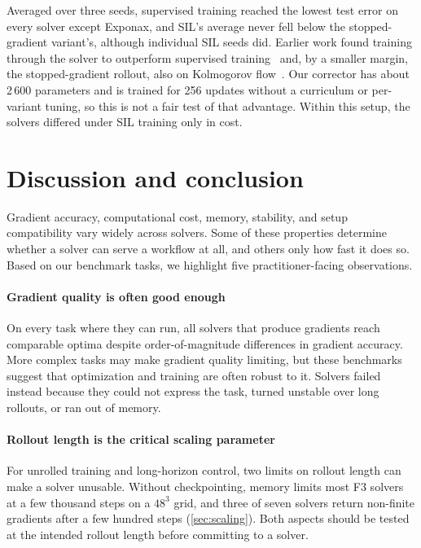 Averaged over three seeds, supervised training reached the lowest test error
on every solver except Exponax, and SIL's average never fell below the
stopped-gradient variant's, although individual SIL seeds did. Earlier work found
training through the solver to outperform supervised
training~\cite{um2020sol} and, by a smaller margin, the stopped-gradient
rollout, also on Kolmogorov flow~\cite{list2024differentiability}. Our
corrector has about 2\,600 parameters and is trained for 256 updates without a
curriculum or per-variant tuning, so this is not a fair test of that advantage.
Within this setup, the solvers differed under SIL training only in cost.

\section{Discussion and conclusion}
\label{sec:conclusion}

Gradient accuracy, computational cost, memory, stability, and setup
compatibility vary widely across solvers. Some of these properties
determine whether a solver can serve a workflow at all, and others only how fast it does so. Based on our
benchmark tasks, we highlight five practitioner-facing observations.

\paragraph{Gradient quality is often good enough}
On every task where they can run, all solvers that produce gradients
reach comparable optima despite order-of-magnitude differences in
gradient accuracy. More complex tasks may make gradient quality limiting,
but these benchmarks suggest that optimization and training are often
robust to it. Solvers failed instead because they could not express the
task, turned unstable over long rollouts, or ran out of memory.

\paragraph{Rollout length is the critical scaling parameter}
For unrolled training and long-horizon control, two limits on rollout
length can make a solver unusable. Without checkpointing, memory limits most
F3 solvers at a few thousand steps on a $48^3$ grid, and three of seven solvers
return non-finite gradients after a few hundred steps (\cref{sec:scaling}). Both aspects should
be tested at the intended rollout length before committing to a solver.

